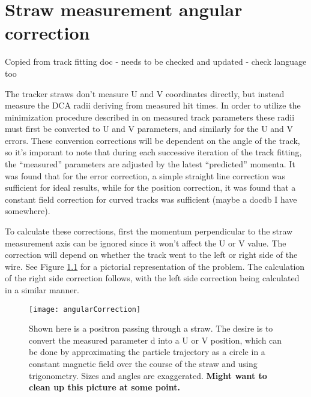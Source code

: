 
\thispagestyle{myheadings}

\chapter{Straw measurement angular correction}
\label{app:angularcorrection}

Copied from track fitting doc - needs to be checked and updated - check language too


The tracker straws don't measure U and V coordinates directly, but instead measure the DCA radii deriving from measured hit times. In order to utilize the minimization procedure described in  on measured track parameters these radii must first be converted to U and V parameters, and similarly for the U and V errors. These conversion corrections will be dependent on the angle of the track, so it's imporant to note that during each successive iteration of the track fitting, the ``measured'' parameters are adjusted by the latest ``predicted'' momenta. It was found that for the error correction, a simple straight line correction was sufficient for ideal results, while for the position correction, it was found that a constant field correction for curved tracks was sufficient \cite{something} (maybe a docdb I have somewhere).

To calculate these corrections, first the momentum perpendicular to the straw measurement axis can be ignored since it won't affect the U or V value. The correction will depend on whether the track went to the left or right side of the wire. See Figure \ref{fig:angularCorrection} for a pictorial representation of the problem. The calculation of the right side correction follows, with the left side correction being calculated in a similar manner.

\begin{figure}[]
	\centering
	\texttt{[image: angularCorrection]}
	\caption{Shown here is a positron passing through a straw. The desire is to convert the measured parameter d into a U or V position, which can be done by approximating the particle trajectory as a circle in a constant magnetic field over the course of the straw and using trigonometry. Sizes and angles are exaggerated. \textbf{Might want to clean up this picture at some point.}}
	\label{fig:angularCorrection}
\end{figure}


